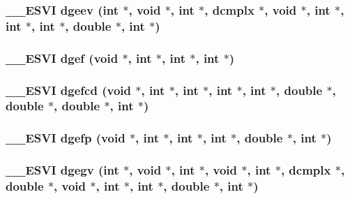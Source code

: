 \subsubsection{\setlength{\rightskip}{0pt plus 5cm}\_\-\_\-ESVI dgeev (int $\ast$, void $\ast$, int $\ast$, {\bf dcmplx} $\ast$, void $\ast$, int $\ast$, int $\ast$, int $\ast$, double $\ast$, int $\ast$)}\label{essl_8h_ac6eab8b13bba164db707763f5932658}


\subsubsection{\setlength{\rightskip}{0pt plus 5cm}\_\-\_\-ESVI dgef (void $\ast$, int $\ast$, int $\ast$, int $\ast$)}\label{essl_8h_a2edb6e1decead2bb4dfd87ace01ce88}


\subsubsection{\setlength{\rightskip}{0pt plus 5cm}\_\-\_\-ESVI dgefcd (void $\ast$, int $\ast$, int $\ast$, int $\ast$, int $\ast$, double $\ast$, double $\ast$, double $\ast$, int $\ast$)}\label{essl_8h_42d102173550079c997ccde26dc097fe}


\subsubsection{\setlength{\rightskip}{0pt plus 5cm}\_\-\_\-ESVI dgefp (void $\ast$, int $\ast$, int $\ast$, int $\ast$, double $\ast$, int $\ast$)}\label{essl_8h_14f2fd0c7706e6a6c67cc3827ed4fca2}


\subsubsection{\setlength{\rightskip}{0pt plus 5cm}\_\-\_\-ESVI dgegv (int $\ast$, void $\ast$, int $\ast$, void $\ast$, int $\ast$, {\bf dcmplx} $\ast$, double $\ast$, void $\ast$, int $\ast$, int $\ast$, double $\ast$, int $\ast$)}\label{essl_8h_8c928054eade22a8819d43ff8b905f4c}


